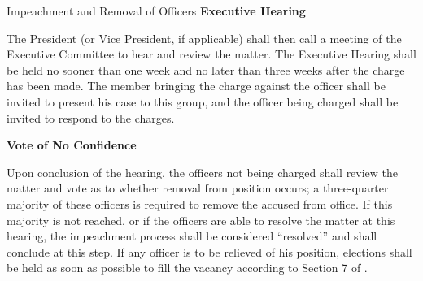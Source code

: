 {\begin{article}{Impeachment and Removal of Officers}
		\hypertarget{Executive Hearing}{}
		\textbf{Executive Hearing}
	
		The President (or Vice President, if applicable) shall then call a meeting of the Executive Committee to hear and review the matter. The Executive Hearing shall be held no sooner than one week and no later than three weeks after the charge has been made. The member bringing the charge against the officer shall be invited to present his case to this group, and the officer being charged shall be invited to respond to the charges.
	
		\hypertarget{Vote of No Confidence}{}
		\textbf{Vote of No Confidence}
		
		Upon conclusion of the hearing, the officers not being charged shall review the matter and vote as to whether removal from position occurs; a three-quarter majority of these officers is required to remove the accused from office. If this majority is not reached, or if the officers are able to resolve the matter at this hearing, the impeachment process shall be considered \enquote{resolved} and shall conclude at this step. If any officer is to be relieved of his position, elections shall be held as soon as possible to fill the vacancy according to Section 7 of .
	\end{article}
}